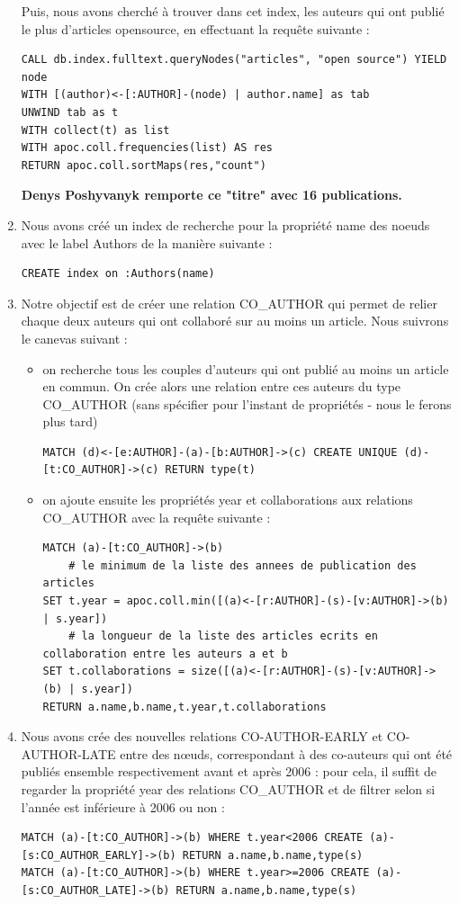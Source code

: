 \documentclass[11pt]{article}
\begin{document}
\begin{enumerate}[resume]
Puis, nous avons cherché à trouver dans cet index, les auteurs qui ont publié le plus d'articles opensource, en effectuant la requête suivante :
\begin{lstlisting}
CALL db.index.fulltext.queryNodes("articles", "open source") YIELD node 
WITH [(author)<-[:AUTHOR]-(node) | author.name] as tab 
UNWIND tab as t 
WITH collect(t) as list 
WITH apoc.coll.frequencies(list) AS res 
RETURN apoc.coll.sortMaps(res,"count")
\end{lstlisting}
\textbf{Denys Poshyvanyk remporte ce "titre" avec 16 publications.}
\item 
Nous avons créé un index de recherche pour la propriété name des noeuds avec le label Authors de la manière suivante :
\begin{lstlisting}
CREATE index on :Authors(name)
\end{lstlisting}
\item 
Notre objectif est de créer une relation CO\_AUTHOR qui permet de relier chaque deux auteurs qui ont collaboré sur au moins un article. Nous suivrons le canevas suivant :
\begin{itemize}
    \item on recherche tous les couples d'auteurs qui ont publié au moins un article en commun. On crée alors une relation entre ces auteurs du type CO\_AUTHOR (sans spécifier pour l'instant de propriétés - nous le ferons plus tard)
    \begin{lstlisting}
MATCH (d)<-[e:AUTHOR]-(a)-[b:AUTHOR]->(c) CREATE UNIQUE (d)-[t:CO_AUTHOR]->(c) RETURN type(t)
    \end{lstlisting}
    \item on ajoute ensuite les propriétés year et collaborations aux relations CO\_AUTHOR avec la requête suivante :
    \begin{lstlisting}
MATCH (a)-[t:CO_AUTHOR]->(b) 
    # le minimum de la liste des annees de publication des articles
SET t.year = apoc.coll.min([(a)<-[r:AUTHOR]-(s)-[v:AUTHOR]->(b) | s.year])
    # la longueur de la liste des articles ecrits en collaboration entre les auteurs a et b
SET t.collaborations = size([(a)<-[r:AUTHOR]-(s)-[v:AUTHOR]->(b) | s.year])
RETURN a.name,b.name,t.year,t.collaborations
    \end{lstlisting}
\end{itemize}
\item 
Nous avons crée des nouvelles relations CO-AUTHOR-EARLY et CO-AUTHOR-LATE entre des nœuds, correspondant à des co-auteurs qui ont été publiés ensemble respectivement avant et après 2006 : pour cela, il suffit de regarder la propriété year des relations CO\_AUTHOR et de filtrer selon si l'année est inférieure à 2006 ou non :
\begin{lstlisting}
MATCH (a)-[t:CO_AUTHOR]->(b) WHERE t.year<2006 CREATE (a)-[s:CO_AUTHOR_EARLY]->(b) RETURN a.name,b.name,type(s)
MATCH (a)-[t:CO_AUTHOR]->(b) WHERE t.year>=2006 CREATE (a)-[s:CO_AUTHOR_LATE]->(b) RETURN a.name,b.name,type(s)
\end{lstlisting}
\end{enumerate}
\end{document}
